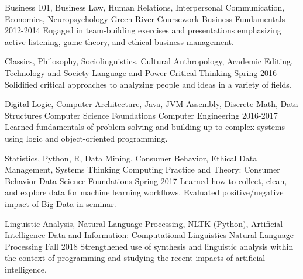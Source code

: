 

\begin{cventries}

  \cventry
    {Business 101, Business Law, Human Relations, Interpersonal Communication, Economics, Neuropsychology} %
    {Green River Coursework} %
    {Business Fundamentals} %
    {2012-2014} %
    {Engaged in team-building exercises and presentations emphasizing active listening, game theory, and ethical business management.}

  \cventry
    {Classics, Philosophy, Sociolinguistics, Cultural Anthropology, Academic Editing, Technology and Society} %
    {Language and Power} %
    {Critical Thinking} %
    {Spring 2016} %
    {Solidified critical approaches to analyzing people and ideas in a variety of fields.}

  \cventry
    {Digital Logic, Computer Architecture, Java, JVM Assembly, Discrete Math, Data Structures} %
    {Computer Science Foundations} %
    {Computer Engineering} %
    {2016-2017} %
    {Learned fundamentals of problem solving and building up to complex systems using logic and object-oriented programming.}

  \cventry
    {Statistics, Python, R, Data Mining, Consumer Behavior, Ethical Data Management, Systems Thinking} %
    {Computing Practice and Theory: Consumer Behavior} %
    {Data Science Foundations} %
    {Spring 2017} %
    {Learned how to collect, clean, and explore data for machine learning workflows. Evaluated positive/negative impact of Big Data in seminar.}

  \cventry
    {Linguistic Analysis, Natural Language Processing, NLTK (Python), Artificial Intelligence} %
    {Data and Information: Computational Linguistics} %
    {Natural Language Processing} %
    {Fall 2018} %
    {Strengthened use of synthesis and linguistic analysis within the context of programming and studying the recent impacts of artificial intelligence.}


\end{cventries}

